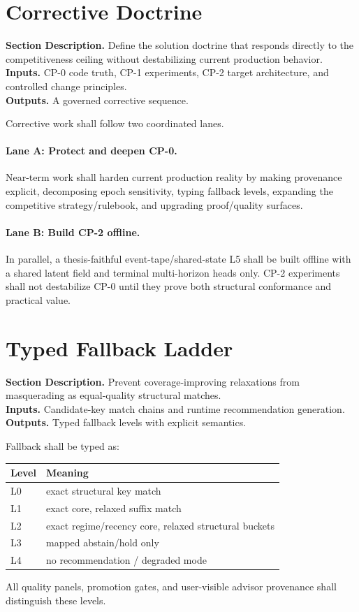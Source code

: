 \documentclass[11pt]{report}
\newcommand{\meta}[3]{\textbf{Section Description.} #1\\
\textbf{Inputs.} #2\\
\textbf{Outputs.} #3\par}
\begin{document}
\section{Corrective Doctrine}
\meta{Define the solution doctrine that responds directly to the competitiveness ceiling without destabilizing current production behavior.}{CP-0 code truth, CP-1 experiments, CP-2 target architecture, and controlled change principles.}{A governed corrective sequence.}

Corrective work shall follow two coordinated lanes.
\paragraph{Lane A: Protect and deepen CP-0.}
Near-term work shall harden current production reality by making provenance explicit, decomposing epoch sensitivity, typing fallback levels, expanding the competitive strategy/rulebook, and upgrading proof/quality surfaces.

\paragraph{Lane B: Build CP-2 offline.}
In parallel, a thesis-faithful event-tape/shared-state L5 shall be built offline with a shared latent field and terminal multi-horizon heads only. CP-2 experiments shall not destabilize CP-0 until they prove both structural conformance and practical value.

\section{Typed Fallback Ladder}
\meta{Prevent coverage-improving relaxations from masquerading as equal-quality structural matches.}{Candidate-key match chains and runtime recommendation generation.}{Typed fallback levels with explicit semantics.}

Fallback shall be typed as:
\begin{longtable}{p{}p{}}
\toprule
Level & Meaning \\
\midrule
L0 & exact structural key match \\
L1 & exact core, relaxed suffix match \\
L2 & exact regime/recency core, relaxed structural buckets \\
L3 & mapped abstain/hold only \\
L4 & no recommendation / degraded mode \\
\bottomrule
\end{longtable}
All quality panels, promotion gates, and user-visible advisor provenance shall distinguish these levels.
\end{document}
